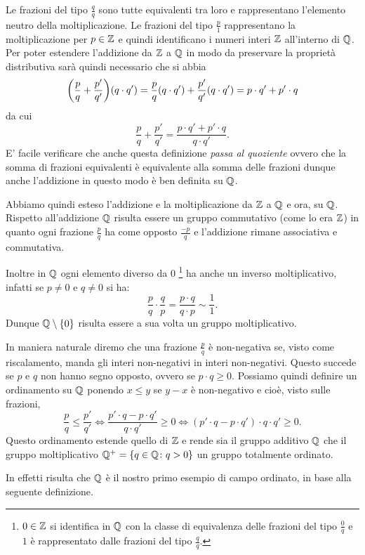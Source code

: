 Le frazioni del tipo $\frac{q}{q}$ sono tutte equivalenti tra loro e rappresentano 
l'elemento neutro della moltiplicazione.
Le frazioni del tipo $\frac{p}{1}$ rappresentano la moltiplicazione per $p\in{\mathbb Z}$ 
e quindi identificano i numeri interi ${\mathbb Z}$ all'interno di ${\mathbb Q}$.
Per poter estendere l'addizione da ${\mathbb Z}$ a ${\mathbb Q}$ in modo da preservare 
la proprietà distributiva sarà quindi necessario che 
si abbia 
\[
  {\left( \frac{p}{q}+\frac{p'}{q'} \right)} (q\cdot q') = \frac{p}{q}(q\cdot q') + \frac{p'}{q'}(q\cdot q')
  = p\cdot q' + p'\cdot q
\]
da cui
\[
  \frac{p}{q} + \frac{p'}{q'} = \frac{p\cdot q'+p'\cdot q}{q\cdot q'}.  
\]
E' facile verificare che anche questa definizione \emph{passa al quoziente}
ovvero che la somma di frazioni equivalenti è equivalente alla somma delle 
frazioni dunque anche l'addizione in questo modo è ben definita su ${\mathbb Q}$.

Abbiamo quindi esteso l'addizione e la moltiplicazione da ${\mathbb Z}$ a ${\mathbb Q}$
e ora, su ${\mathbb Q}$.
Rispetto all'addizione ${\mathbb Q}$ risulta essere un gruppo commutativo (come lo era ${\mathbb Z}$)
in quanto ogni frazione $\frac{p}{q}$ ha come opposto $\frac{-p}{q}$ 
e l'addizione rimane associativa e commutativa.

Inoltre in ${\mathbb Q}$ ogni elemento diverso da $0$
\footnote{$0\in {\mathbb Z}$ si identifica in ${\mathbb Q}$ con la classe di equivalenza 
delle frazioni del tipo $\frac{0}{q}$ e $1$ è rappresentato 
dalle frazioni del tipo $\frac{q}{q}$.}
ha anche un inverso moltiplicativo, infatti se $p\neq 0$ e $q\neq 0$ si ha:
\[
 \frac{p}{q}\cdot \frac{q}{p} = \frac{p\cdot q}{q\cdot p} \sim \frac{1}{1}.  
\]
Dunque ${\mathbb Q}\setminus{\left\{ 0 \right\}}$ risulta essere a sua volta un gruppo 
moltiplicativo.

In maniera naturale diremo che una frazione $\frac{p}{q}$ è non-negativa 
se, visto come riscalamento, manda gli interi non-negativi in interi non-negativi. 
Questo succede se $p$ e $q$ non hanno segno opposto, ovvero se $p\cdot q\ge 0$.
Possiamo quindi definire un ordinamento su ${\mathbb Q}$ 
ponendo $x\le y$ se $y-x$ è non-negativo e cioè, visto sulle frazioni,
\[
 \frac{p}{q} \le \frac{p'}{q'} \iff \frac{p'\cdot q-p\cdot q'}{q\cdot q'}\ge 0 
 \iff (p'\cdot q-p\cdot q')\cdot q\cdot q' \ge 0. 
\]
Questo ordinamento estende quello di ${\mathbb Z}$ e rende sia il gruppo additivo ${\mathbb Q}$
che il gruppo moltiplicativo ${\mathbb Q}^+ = {\left\{ q\in {\mathbb Q}\colon q>0 \right\}}$
un gruppo totalmente ordinato. 

In effetti risulta che ${\mathbb Q}$ è il nostro primo esempio 
di campo ordinato, in base alla seguente definizione.

